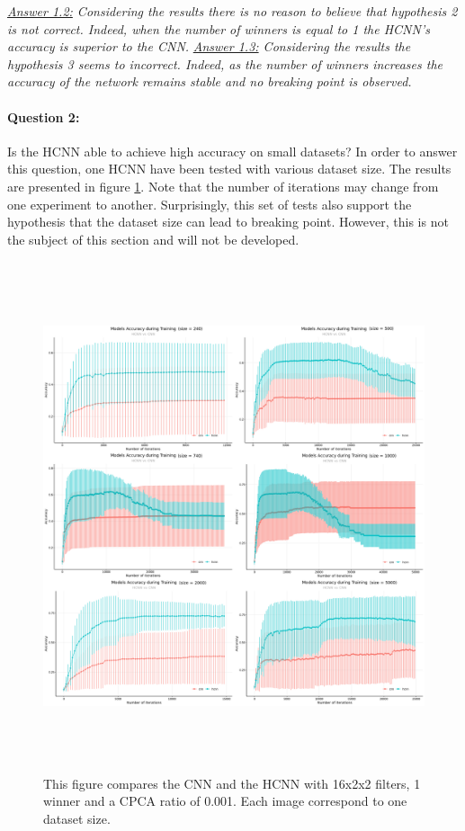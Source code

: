 \documentclass[11pt]{report}
\begin{document}
\noindent \textit{\underline{Answer 1.2:} Considering the results there is no reason to believe that hypothesis 2 is not correct. Indeed, when the number of winners is equal to 1 the HCNN's accuracy is superior to the CNN.}
\newline
\noindent \textit{\underline{Answer 1.3:} Considering the results the hypothesis 3 seems to incorrect. Indeed, as the number of winners increases the accuracy of the network remains stable and no breaking point is observed.}
\newpage

\paragraph{Question 2:} Is the HCNN able to achieve high accuracy on small datasets?
\newline
\newline
\noindent In order to answer this question, one HCNN have been tested with various dataset size. The results are presented in figure \ref{fig:hcnn_small_data_set}. Note that the number of iterations may change from one experiment to another. Surprisingly, this set of tests also support the hypothesis that the dataset size can lead to breaking point. However, this is not the subject of this section and will not be developed.

\begin{figure}[h]
\centering
\includegraphics[width=15cm, height=15cm]{longRun-f_16}
\caption[Experiment 3: Is the HCNN able to achieve high accuracy on small datasets?]{This figure compares the CNN and the HCNN with 16x2x2 filters, 1 winner and a CPCA ratio of 0.001. Each image correspond to one dataset size.}
\label{fig:hcnn_small_data_set}
\end{figure}
\end{document}
